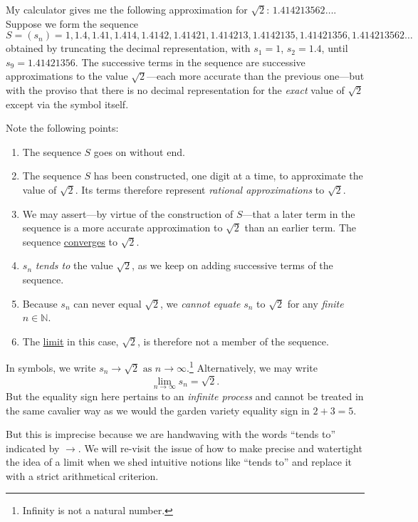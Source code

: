 \documentclass[
  a4paper,
]{article}
\begin{document}
My calculator gives me the following approximation for \(\sqrt{2}\):
\(1.414213562\dots\). Suppose we form the sequence \[
S = (s_n) = 1, 1.4, 1.41, 1.414, 1.4142, 1.41421, 1.414213, 1.4142135, 1.41421356, 1.414213562 \dots
\] obtained by truncating the decimal representation, with
\(s_{1} = 1\), \(s_{2} = 1.4\), until \(s_{9} = 1.41421356\). The
successive terms in the sequence are successive approximations to the
value \(\sqrt{2}\)---each more accurate than the previous one---but with
the proviso that there is no decimal representation for the \emph{exact}
value of \(\sqrt{2}\) except via the symbol itself.

Note the following points:

\begin{enumerate}
\item
  The sequence \(S\) goes on without end.
\item
  The sequence \(S\) has been constructed, one digit at a time, to
  approximate the value of \(\sqrt{2}\). Its terms therefore represent
  \emph{rational approximations} to \(\sqrt{2}\).
\item
  We may assert---by virtue of the construction of \(S\)---that a later
  term in the sequence is a more accurate approximation to \(\sqrt{2}\)
  than an earlier term. The sequence
  \href{https://en.wikipedia.org/wiki/Convergent_series}{converges} to
  \(\sqrt{2}\).
\item
  \(s_{n}\) \emph{tends to} the value \(\sqrt{2}\), as we keep on adding
  successive terms of the sequence.
\item
  Because \(s_{n}\) can never equal \(\sqrt{2}\), we \emph{cannot
  equate} \(s_{n}\) to \(\sqrt{2}\) for any \emph{finite}
  \(n \in \mathbb{N}\).
\item
  The \href{https://en.wikipedia.org/wiki/Limit_(mathematics)}{limit} in
  this case, \(\sqrt{2}\), is therefore not a member of the sequence.
\end{enumerate}

In symbols, we write
\(s_{n} \to \sqrt{2} \text{ as } n \to \infty\).\footnote{Infinity is
  not a natural number.} Alternatively, we may write
\[\lim_{n \to \infty}s_{n} = \sqrt{2}.
\] But the equality sign here pertains to an \emph{infinite process} and
cannot be treated in the same cavalier way as we would the garden
variety equality sign in \(2 + 3 = 5\).

But this is imprecise because we are handwaving with the words ``tends
to'' indicated by \(\to\). We will re-visit the issue of how to make
precise and watertight the idea of a limit when we shed intuitive
notions like ``tends to'' and replace it with a strict arithmetical
criterion.
\end{document}
